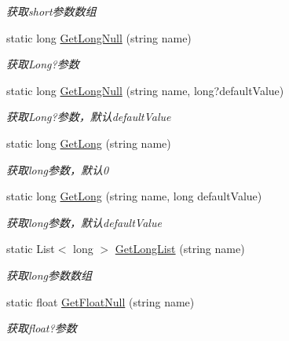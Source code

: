 \begin{DoxyCompactItemize}
\begin{DoxyCompactList}\small\item\em 获取short参数数组 \end{DoxyCompactList}\item 
static long \hyperlink{class_x_c_l_net_tools_1_1_string_hander_1_1_form_helper_abffef0560d4655c00c5bdd3e4ff087cc}{Get\-Long\-Null} (string name)
\begin{DoxyCompactList}\small\item\em 获取\-Long?参数 \end{DoxyCompactList}\item 
static long \hyperlink{class_x_c_l_net_tools_1_1_string_hander_1_1_form_helper_a7e009fc6b804b15f2015d78ed3581677}{Get\-Long\-Null} (string name, long?default\-Value)
\begin{DoxyCompactList}\small\item\em 获取\-Long?参数，默认default\-Value \end{DoxyCompactList}\item 
static long \hyperlink{class_x_c_l_net_tools_1_1_string_hander_1_1_form_helper_a55353bd867fa827c8eb55a710df02cb1}{Get\-Long} (string name)
\begin{DoxyCompactList}\small\item\em 获取long参数，默认0 \end{DoxyCompactList}\item 
static long \hyperlink{class_x_c_l_net_tools_1_1_string_hander_1_1_form_helper_a51392713a245c7460bb5c823eb664ef8}{Get\-Long} (string name, long default\-Value)
\begin{DoxyCompactList}\small\item\em 获取long参数，默认default\-Value \end{DoxyCompactList}\item 
static List$<$ long $>$ \hyperlink{class_x_c_l_net_tools_1_1_string_hander_1_1_form_helper_ac00bef1db952ab0901c1813bbe193fa0}{Get\-Long\-List} (string name)
\begin{DoxyCompactList}\small\item\em 获取long参数数组 \end{DoxyCompactList}\item 
static float \hyperlink{class_x_c_l_net_tools_1_1_string_hander_1_1_form_helper_a6d0d3c455a9582ca4a4fa5bf4269deff}{Get\-Float\-Null} (string name)
\begin{DoxyCompactList}\small\item\em 获取float?参数 \end{DoxyCompactList}\item 

\end{DoxyCompactItemize}
